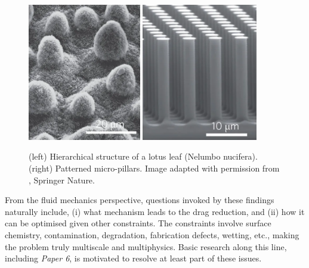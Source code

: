 \begin{figure}%
  \centering
  \includegraphics[height=6cm]{lotus.png}
  \includegraphics[height=6cm]{micro-pillars.png}
  \caption{(left) Hierarchical structure of a lotus leaf (Nelumbo nucifera). (right) Patterned micro-pillars. Image adapted with permission from \cite{Bocquet}, \textcopyright \enspace Springer Nature.}
  \label{fig:micro-surface}
\end{figure}

From the fluid mechanics perspective, questions invoked by these findings naturally include,
(i) what mechanism leads to the drag reduction, and
(ii) how it can be optimised given other constraints.
The constraints involve surface chemistry, contamination, degradation, fabrication defects, wetting, etc., making the problem truly multiscale and multiphysics.
Basic research along this line, including \emph{Paper 6}, is motivated to resolve at least part of these issues.

